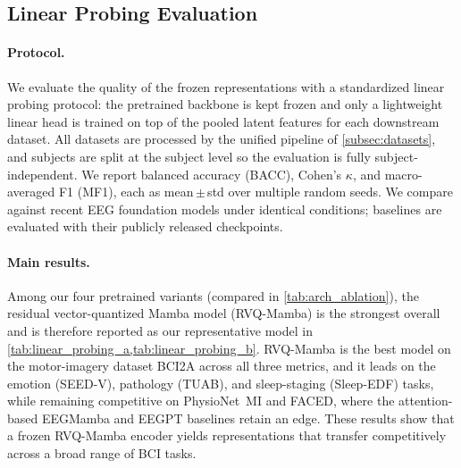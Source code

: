 \documentclass{article}
\begin{document}
\subsection{Linear Probing Evaluation}
\label{subsec:linear_probing}

\paragraph{Protocol.}
We evaluate the quality of the frozen representations with a standardized linear
probing protocol: the pretrained backbone is kept frozen and only a lightweight
linear head is trained on top of the pooled latent features for each downstream
dataset. All datasets are processed by the unified pipeline of
\cref{subsec:datasets}, and subjects are split at the subject level so the
evaluation is fully subject-independent. We report balanced accuracy (BACC),
Cohen's $\kappa$, and macro-averaged F1 (MF1), each as mean\,$\pm$\,std over
multiple random seeds. We compare against recent EEG foundation models under
identical conditions; baselines are evaluated with their publicly released
checkpoints.

\paragraph{Main results.}
Among our four pretrained variants (compared in \cref{tab:arch_ablation}), the
residual vector-quantized Mamba model (RVQ-Mamba) is the strongest overall and
is therefore reported as our representative model in
\cref{tab:linear_probing_a,tab:linear_probing_b}. RVQ-Mamba is the best model on
the motor-imagery dataset BCI2A across all three metrics, and it leads on the
emotion (SEED-V), pathology (TUAB), and sleep-staging (Sleep-EDF) tasks, while
remaining competitive on PhysioNet~MI and FACED, where the attention-based
EEGMamba and EEGPT baselines retain an edge. These results show that a frozen
RVQ-Mamba encoder yields representations that transfer competitively across a
broad range of BCI tasks.
\end{document}

